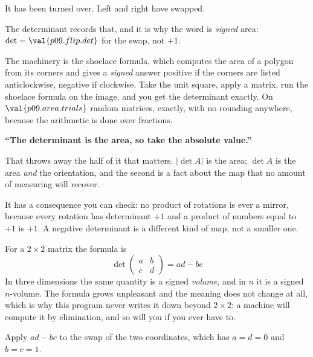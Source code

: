 \begin{fr}
\begin{ansblock}
It has been turned over. Left and right have swapped.
\end{ansblock}

The determinant records that, and it is why the word is \emph{signed} area:
$\det = \val{p09.flip.det}$ for the swap, not $+1$.

The machinery is the shoelace formula, which computes the area of a polygon
from its corners and gives a \emph{signed} answer \dash{} positive if the
corners are listed anticlockwise, negative if clockwise. Take the unit square,
apply a matrix, run the shoelace formula on the image, and you get the
determinant exactly. On $\val{p09.area.trials}$ random matrices, exactly, with
no rounding anywhere, because the arithmetic is done over fractions.
\end{fr}

\begin{trapbox}
\textbf{\enquote{The determinant is the area, so take the absolute value.}}

That throws away the half of it that matters. $\lvert \det A \rvert$ is the
area; $\det A$ is the area \emph{and} the orientation, and the second is a fact
about the map that no amount of measuring will recover.

It has a consequence you can check: no product of rotations is ever a mirror,
because every rotation has determinant $+1$ and a product of numbers equal to
$+1$ is $+1$. A negative determinant is a different kind of map, not a smaller
one.
\end{trapbox}

\begin{fr}
For a $2 \times 2$ matrix the formula is
\[ \det \begin{pmatrix} a & b \\ c & d \end{pmatrix} = ad - bc \]
In three dimensions the same quantity is a signed \emph{volume}, and in $n$ it
is a signed $n$-volume. The formula grows unpleasant and the meaning does not
change at all, which is why this program never writes it down beyond
$2 \times 2$: a machine will compute it by elimination, and so will you if you
ever have to.

Apply $ad - bc$ to the swap of the two coordinates, which has $a = d = 0$ and
$b = c = 1$.
\dotline
\nextframe
\end{fr}

